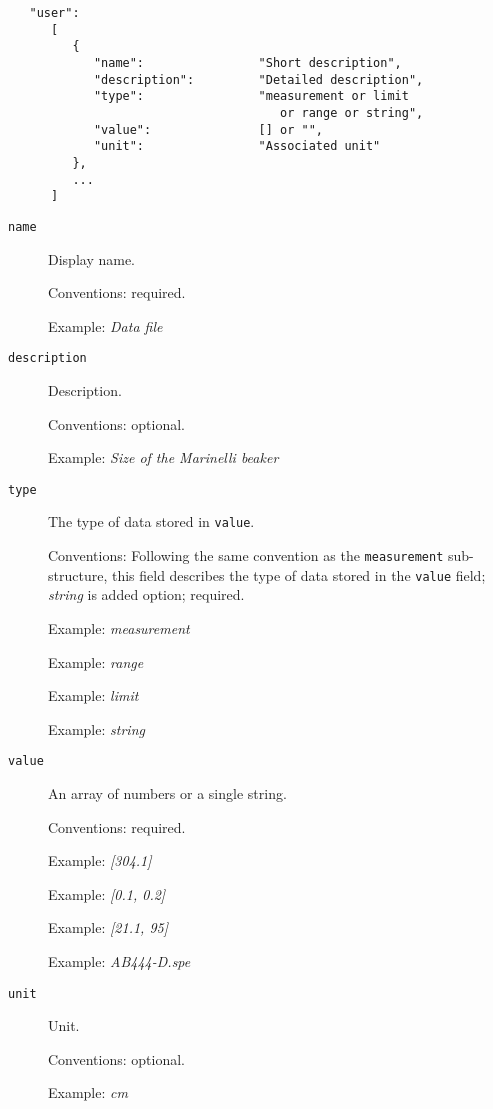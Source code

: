 \documentclass[11pt, letterpaper]{article}
\begin{document}
\begin{small}
\begin{verbatim}
   "user": 
      [
         {
            "name":                "Short description",
            "description":         "Detailed description",         
            "type":                "measurement or limit 
                                      or range or string",           
            "value":               [] or "",             
            "unit":                "Associated unit"
         },     
         ...
      ]
\end{verbatim}
\end{small}



\begin{description}

  \item[\texttt{name}] Display name.

  Conventions: required.
  
  Example: \textit{Data file}


  \item[\texttt{description}] Description.

  Conventions: optional.
  
  Example: \textit{Size of the Marinelli beaker} 
  
\newpage
  \item[\texttt{type}] The type of data stored in \texttt{value}.

  Conventions: Following the same convention as the \texttt{measurement} sub-structure, this field describes the type of data stored in the \texttt{value} field; \textit{string} is added option; required. 
  
  Example: \textit{measurement} 

  Example: \textit{range}
  
  Example: \textit{limit}
  
  Example: \textit{string}  
  
  \item[\texttt{value}] An array of numbers or a single string.

  Conventions: required.

  Example: \textit{[304.1]}
  
  Example: \textit{[0.1, 0.2]}   

  Example: \textit{[21.1, 95]}   

  Example: \textit{AB444-D.spe}      

  \item[\texttt{unit}] Unit.

  Conventions: optional.

  Example: \textit{cm}

\end{description}
\end{document}

